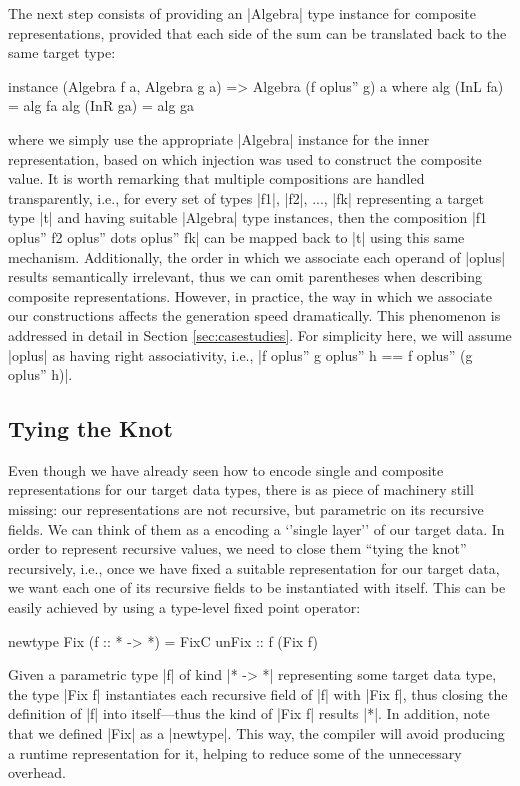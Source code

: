 The next step consists of providing an |Algebra| type instance for composite
representations, provided that each side of the sum can be translated back to
the same target type:

\begin{code}
instance (Algebra f a, Algebra g a) => Algebra (f oplus'' g) a
  where  alg (InL fa) = alg fa
         alg (InR ga) = alg ga
\end{code}
%
where we simply use the appropriate |Algebra| instance for the inner
representation, based on which injection was used to construct the composite
value.
%
It is worth remarking that multiple compositions are handled transparently,
i.e., for every set of types |f1|, |f2|, ..., |fk| representing a target type
|t| and having suitable |Algebra| type instances, then the composition |f1
oplus'' f2 oplus'' dots oplus'' fk| can be mapped back to |t| using this same
mechanism.
%
Additionally, the order in which we associate each operand of |oplus| results
semantically irrelevant, thus we can omit parentheses when describing composite
representations.
%
However, in practice, the way in which we associate our constructions affects
the generation speed dramatically.
%
This phenomenon is addressed in detail in Section \ref{sec:casestudies}.
%
For simplicity here, we will assume |oplus| as having right associativity, i.e.,
|f oplus'' g oplus'' h == f oplus'' (g oplus'' h)|.


%
\subsection{Tying the Knot}

Even though we have already seen how to encode single and composite
representations for our target data types, there is as piece of machinery still
missing: our representations are not recursive, but parametric on its recursive
fields.
%
We can think of them as a encoding a `'single layer'' of our target data.
%
In order to represent recursive values, we need to close them ``tying the knot''
recursively, i.e., once we have fixed a suitable representation for our target
data, we want each one of its recursive fields to be instantiated with itself.
%
This can be easily achieved by using a type-level fixed point operator:

\begin{code}
newtype Fix (f :: * -> *) = FixC { unFix :: f (Fix f) }
\end{code}
%
Given a parametric type |f| of kind |* -> *| representing some target data type,
the type |Fix f| instantiates each recursive field of |f| with |Fix f|, thus
closing the definition of |f| into itself---thus the kind of |Fix f| results
|*|.
%
In addition, note that we defined |Fix| as a |newtype|.
%
This way, the compiler will avoid producing a runtime representation for it,
helping to reduce some of the unnecessary overhead.
%


